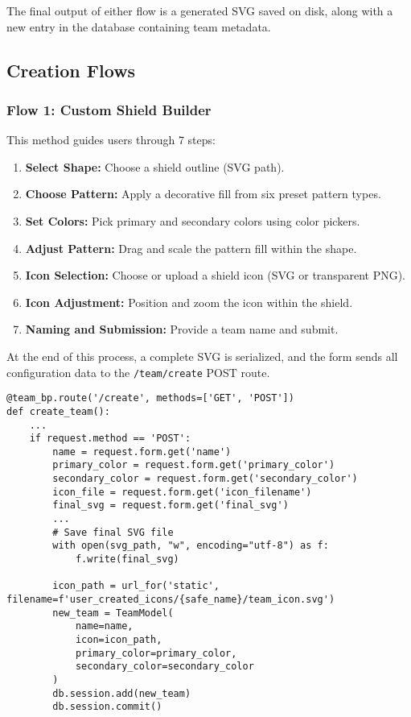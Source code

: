 \documentclass[12pt]{article}
\begin{document}
The final output of either flow is a generated SVG saved on disk, along with a new entry in the database containing team metadata.

\subsection{Creation Flows}

\subsubsection*{Flow 1: Custom Shield Builder}

This method guides users through 7 steps:

\begin{enumerate}
    \item \textbf{Select Shape:} Choose a shield outline (SVG path).
    \item \textbf{Choose Pattern:} Apply a decorative fill from six preset pattern types.
    \item \textbf{Set Colors:} Pick primary and secondary colors using color pickers.
    \item \textbf{Adjust Pattern:} Drag and scale the pattern fill within the shape.
    \item \textbf{Icon Selection:} Choose or upload a shield icon (SVG or transparent PNG).
    \item \textbf{Icon Adjustment:} Position and zoom the icon within the shield.
    \item \textbf{Naming and Submission:} Provide a team name and submit.
\end{enumerate}

\noindent At the end of this process, a complete SVG is serialized, and the form sends all configuration data to the \texttt{/team/create} POST route.
\begin{verbatim}
@team_bp.route('/create', methods=['GET', 'POST'])
def create_team():
    ...
    if request.method == 'POST':
        name = request.form.get('name')
        primary_color = request.form.get('primary_color')
        secondary_color = request.form.get('secondary_color')
        icon_file = request.form.get('icon_filename')
        final_svg = request.form.get('final_svg')
        ...
        # Save final SVG file
        with open(svg_path, "w", encoding="utf-8") as f:
            f.write(final_svg)

        icon_path = url_for('static', filename=f'user_created_icons/{safe_name}/team_icon.svg')
        new_team = TeamModel(
            name=name,
            icon=icon_path,
            primary_color=primary_color,
            secondary_color=secondary_color
        )
        db.session.add(new_team)
        db.session.commit()
\end{verbatim}
\end{document}
